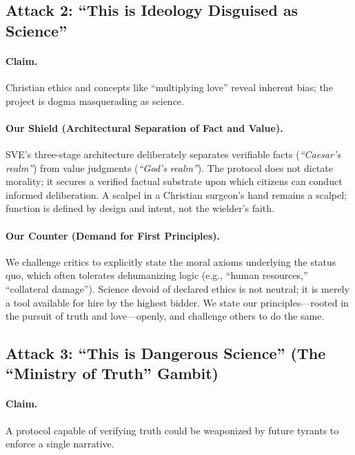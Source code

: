 \documentclass[11pt,a4paper]{article}
\begin{document}
\begin{small}
\vspace{1em}

\subsection*{\textcolor{accentcolor}{Attack 2: ``This is Ideology Disguised as Science''}}

\paragraph{\textbf{Claim.}} Christian ethics and concepts like ``multiplying love'' reveal inherent bias; the project is dogma masquerading as science.

\paragraph{\textbf{Our Shield (Architectural Separation of Fact and Value).}} SVE's three-stage architecture deliberately separates verifiable facts (\textit{``Caesar's realm''}) from value judgments (\textit{``God's realm''}). The protocol does not dictate morality; it secures a verified factual substrate upon which citizens can conduct informed deliberation. A scalpel in a Christian surgeon's hand remains a scalpel; function is defined by design and intent, not the wielder's faith.

\paragraph{\textbf{Our Counter (Demand for First Principles).}} We challenge critics to explicitly state the moral axioms underlying the status quo, which often tolerates dehumanizing logic (e.g., ``human resources,'' ``collateral damage''). Science devoid of declared ethics is not neutral; it is merely a tool available for hire by the highest bidder. We state our principles—rooted in the pursuit of truth and love—openly, and challenge others to do the same.

\vspace{1em}

\subsection*{\textcolor{accentcolor}{Attack 3: ``This is Dangerous Science'' (The ``Ministry of Truth'' Gambit)}}

\paragraph{\textbf{Claim.}} A protocol capable of verifying truth could be weaponized by future tyrants to enforce a single narrative.


\end{small}
\end{document}
